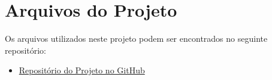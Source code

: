 \section{Arquivos do Projeto}

Os arquivos utilizados neste projeto podem ser encontrados no seguinte repositório:

\begin{itemize}
    \item \href{https://github.com/luizros/pricom/tree/main/lab_1/gnu_radio}{Repositório do Projeto no GitHub}
\end{itemize}